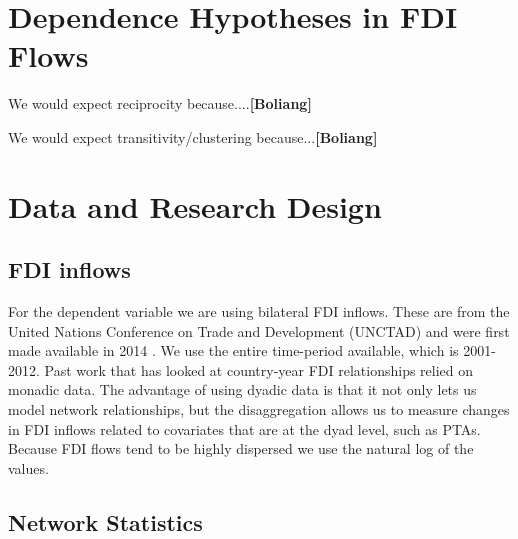 \documentclass{article}
\begin{document}
\section{Dependence Hypotheses in FDI Flows}

We would expect reciprocity because....{\bf [Boliang]}

We would expect transitivity/clustering because...{\bf [Boliang]}


\section{Data and Research Design}

\subsection{FDI inflows}

For the dependent variable we are using bilateral FDI inflows. These are from the United Nations Conference on Trade and Development (UNCTAD) and were first made available in 2014 \citep{UNCTAD}. We use the entire time-period available, which is 2001-2012. Past work that has looked at country-year FDI relationships relied on monadic data. The advantage of using dyadic data is that it not only lets us model network relationships, but the disaggregation allows us to measure changes in FDI inflows related to covariates that are at the dyad level, such as PTAs. Because FDI flows tend to be highly dispersed we use the natural log of the values. 

\subsection{Network Statistics}
\end{document}

